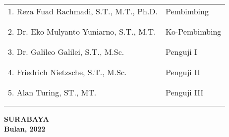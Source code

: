     \noindent
    \begin{tabularx}{\textwidth}{X l}
      1. Reza Fuad Rachmadi, S.T., M.T., Ph.D.          & Pembimbing \\
      &  \\
      &  \\
      2. Dr. Eko Mulyanto Yuniarno, S.T., M.T.     & Ko-Pembimbing \\
      &  \\
      &  \\
      3. Dr. Galileo Galilei, S.T., M.Sc.  & Penguji I \\
      &  \\
      &  \\
      4. Friedrich Nietzsche, S.T., M.Sc.  & Penguji II \\
      &  \\
      &  \\
      5. Alan Turing, ST., MT.             & Penguji III \\
      &  \\
      &  \\
    \end{tabularx}
  \endgroup

  \vspace{12ex}




  \begin{center}
    \textbf{SURABAYA\\Bulan, 2022}
  \end{center}
\endgroup
